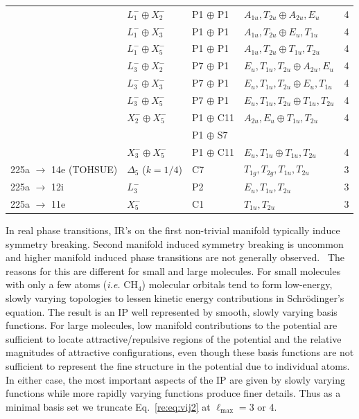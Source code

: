 \documentclass[preprint]{iucr}              %
\begin{document}
\begin{table}
\begin{tabular}{lllll}
& $L_1^- \oplus X_2^-$ &  P1 $\oplus$ P1 & $A_{1u},T_{2u} \oplus A_{2u},E_u$ & 4 \\

& $L_1^- \oplus X_3^-$ &  P1 $\oplus$ P1 & $A_{1u},T_{2u} \oplus E_u,T_{1u}$ & 4 \\

& $L_1^- \oplus X_5^-$ &  P1 $\oplus$ P1 & $A_{1u},T_{2u} \oplus T_{1u},T_{2u}$ & 4 \\

& $L_3^- \oplus X_2^-$ &  P7 $\oplus$ P1 & $E_u,T_{1u},T_{2u} \oplus A_{2u},E_u$ & 4 \\

& $L_3^- \oplus X_3^-$ &  P7 $\oplus$ P1 & $E_u,T_{1u},T_{2u} \oplus E_u,T_{1u}$ & 4 \\

& $L_3^- \oplus X_5^-$ &  P7 $\oplus$ P1 & $E_u,T_{1u},T_{2u} \oplus T_{1u},T_{2u}$ & 4 \\

& $X_2^- \oplus X_5^-$ &  P1 $\oplus$ C11 & $A_{2u},E_u \oplus T_{1u},T_{2u}$ & 4 \\

& & P1 $\oplus$ S7 & &  \\

& $X_3^- \oplus X_5^-$ &  P1 $\oplus$ C11 & $E_u,T_{1u} \oplus T_{1u},T_{2u}$ & 4 \\

225a $\rightarrow$ 14e (TOHSUE) & $\Delta_5$ ($k=1/4$) & C7 &
$T_{1g},T_{2g},T_{1u},T_{2u}$ & 3 \\

225a $\rightarrow$ 12i & $L_3^-$ & P2 & $E_u,T_{1u},T_{2u}$ & 3 \\

225a $\rightarrow$ 11e & $X_5^-$ & C1 & $T_{1u},T_{2u}$ & 3\\
\hline
\end{tabular}
\end{table}

In real phase transitions, IR's on the first non-trivial manifold
typically induce symmetry breaking. Second manifold induced symmetry
breaking is uncommon and higher manifold induced phase transitions
are not generally observed.~\cite{LyndenBell94} The reasons for this
are different for small and large molecules. For small molecules
with only a few atoms (\emph{i.e.} CH$_4$) molecular orbitals tend
to form low-energy, slowly varying topologies to lessen kinetic
energy contributions in Schr\"{o}dinger's equation. The result is an
IP well represented by smooth, slowly varying basis functions. For
large molecules, low manifold contributions to the potential are
sufficient to locate attractive/repulsive regions of the potential
and the relative magnitudes of attractive configurations, even
though these basis functions are not sufficient to represent the
fine structure in the potential due to individual
atoms.~\cite{Hloucha01} In either case, the most important aspects
of the IP are given by slowly varying functions  while more rapidly
varying functions produce finer details. Thus as a minimal basis set
we truncate Eq.~\ref{re:eq:vij2} at $\ell_{\mathrm{max}}=3$ or 4.
\end{document}

